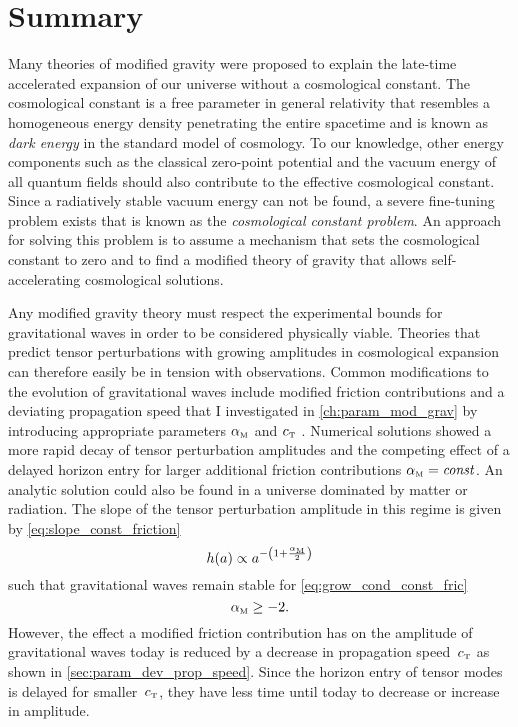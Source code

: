 \cleardoublepage
\chapter{Summary}\label{ch:summary}

Many theories of modified gravity were proposed to explain the late-time accelerated expansion of our universe without a cosmological constant. The cosmological constant is a free parameter in general relativity that resembles a homogeneous energy density penetrating the entire spacetime and is known as \emph{dark energy} in the \LCDM{} standard model of cosmology. To our knowledge, other energy components such as the classical zero-point potential and the vacuum energy of all quantum fields should also contribute to the effective cosmological constant. Since a radiatively stable vacuum energy can not be found, a severe fine-tuning problem exists that is known as the \emph{cosmological constant problem}. An approach for solving this problem is to assume a mechanism that sets the cosmological constant to zero and to find a modified theory of gravity that allows self-accelerating cosmological solutions.

Any modified gravity theory must respect the experimental bounds for gravitational waves in order to be considered physically viable. Theories that predict tensor perturbations with growing amplitudes in cosmological expansion can therefore easily be in tension with observations. Common modifications to the evolution of gravitational waves include modified friction contributions and a deviating propagation speed that I investigated in \autoref{ch:param_mod_grav} by introducing appropriate parameters \({\alpha_{\textnormal{\tiny{M}}}}\) and \({c_{\textnormal{\tiny{T}}}}\) \autocite{Amendola2014,Pettorino2014}. Numerical solutions showed a more rapid decay of tensor perturbation amplitudes and the competing effect of a delayed horizon entry for larger additional friction contributions \({\alpha_{\textnormal{\tiny{M}}}}=\textnormal{\textit{const}}\). An analytic solution could also be found in a universe dominated by matter or radiation. The slope of the tensor perturbation amplitude in this regime is given by \eqref{eq:slope_const_friction}
\begin{equation}
	h(a) \propto a^{-\del{1+\frac{\alphaM}{2}}}
\end{equation}
such that gravitational waves remain stable for \eqref{eq:grow_cond_const_fric}
\begin{equation}
	{\alpha_{\textnormal{\tiny{M}}}} \geq -2
	\mathpunct{.}
\end{equation}
However, the effect a modified friction contribution has on the amplitude of gravitational waves today is reduced by a decrease in propagation speed~\({c_{\textnormal{\tiny{T}}}}\) as shown in \autoref{sec:param_dev_prop_speed}. Since the horizon entry of tensor modes is delayed for smaller~\({c_{\textnormal{\tiny{T}}}}\), they have less time until today to decrease or increase in amplitude.

